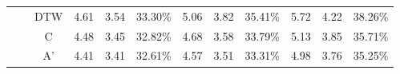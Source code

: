 \begin{table}[t!]
\begin{center}
{\begin{tabular}{c|c|c|ccc|ccc|ccc}
                                                 &                        & DTW                     & 4.61       & 3.54      & 33.30\%     & 5.06      & 3.82      & 35.41\%     & 5.72       & 4.22       & 38.26\%     \\
                                                 &                        & C                       & 4.48       & 3.45      & 32.82\%     & 4.68      & 3.58      & 33.79\%     & 5.13       & 3.85       & 35.71\%     \\
                                                 &                        & A'                      & 4.41       & 3.41      & 32.61\%     & 4.57      & 3.51      & 33.31\%     & 4.98       & 3.76       & 35.25\%     \\
                \hline
                \hline


\end{tabular}}
\end{center}
\end{table}
